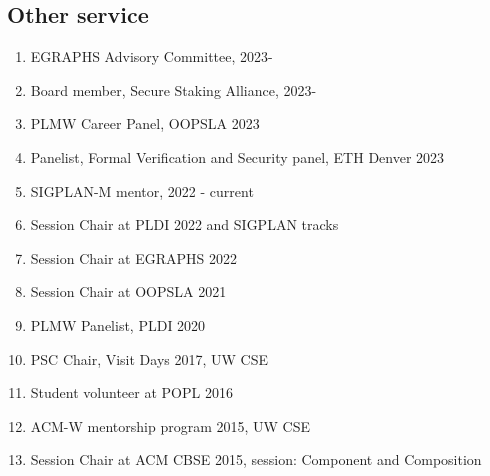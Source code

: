 \documentclass[margin, 10pt]{res} %
\begin{document}
\begin{resume}
\subsection{Other service}
\begin{enumerate}[itemsep=-2pt]
\item EGRAPHS Advisory Committee, 2023-
\item Board member, Secure Staking Alliance, 2023-
\item PLMW Career Panel, OOPSLA 2023
\item {Panelist, Formal Verification and Security panel, ETH Denver 2023}
\item SIGPLAN-M mentor, 2022 - current
\item Session Chair at PLDI 2022 and SIGPLAN tracks
\item Session Chair at EGRAPHS 2022
\item Session Chair at OOPSLA 2021
\item PLMW Panelist, PLDI 2020
\item PSC Chair, Visit Days 2017, UW CSE
\item Student volunteer at POPL 2016
\item ACM-W mentorship program 2015, UW CSE
\item Session Chair at ACM CBSE 2015, session: Component and Composition
\end{enumerate}


\end{resume}
\end{document}
